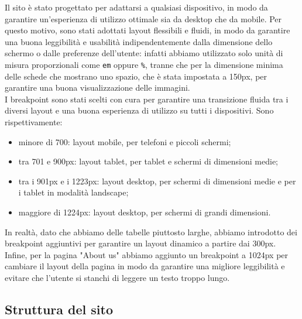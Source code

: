 Il sito è stato progettato per adattarsi a qualsiasi dispositivo, in modo da
garantire un'esperienza di utilizzo ottimale sia da desktop che da mobile. Per
questo motivo, sono stati adottati layout flessibili e fluidi, in modo da
garantire una buona leggibilità e usabilità indipendentemente dalla dimensione
dello schermo o dalle preferenze dell'utente: infatti abbiamo utilizzato solo
unità di misura proporzionali come \texttt{em} oppure \texttt{\%}, tranne che
per la dimensione minima delle schede che mostrano uno spazio, che è stata
impostata a 150px, per garantire una buona visualizzazione delle immagini.\\
I breakpoint sono stati scelti
con cura per garantire una transizione fluida tra i diversi layout e una
buona esperienza di utilizzo su tutti i dispositivi. Sono rispettivamente:
\begin{itemize}
	\item minore di 700: layout mobile, per telefoni e piccoli schermi;

	\item tra 701 e 900px: layout tablet, per tablet e schermi di dimensioni
	      medie;

	\item tra i 901px e i 1223px: layout desktop, per schermi di dimensioni
	      medie e per i tablet in modalità landscape;

	\item maggiore di 1224px: layout desktop, per schermi di grandi dimensioni.
\end{itemize}

In realtà, dato che abbiamo delle tabelle piuttosto larghe, abbiamo introdotto
dei breakpoint aggiuntivi per garantire un layout dinamico a partire dai
300px.\\
Infine, per la pagina "About us" abbiamo aggiunto un breakpoint a 1024px per
cambiare il layout della pagina in modo da garantire una migliore leggibilità
e evitare che l'utente si stanchi di leggere un testo troppo lungo.

\subsection{Struttura del sito}

